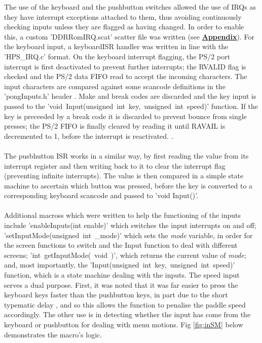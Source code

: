 \documentclass[a4paper,12pt]{article}
\begin{document}
\begin{flushleft}
The use of the keyboard and the pushbutton switches allowed the use of IRQs as they have interrupt exceptions attached to them, thus avoiding continuously checking inputs unless they are flagged as having changed. In order to enable this, a custom 'DDRRomIRQ.scat' scatter file was written (see \textbf{\hyperref[section:appendix]{Appendix}}). For the keyboard input, a keyboardISR handler was written in line with the 'HPS\_IRQ.c' format. On the keyboard interrupt flagging, the PS/2 port interrupt is first deactivated to prevent further interrupts; the RVALID flag is checked and the PS/2 data FIFO read \cite{altera_2014} to accept the incoming characters. The input characters are compared against some scancode definitions in the 'pongInputs.h' header \cite{altium_ps2}. Make and break codes are discarded and the key input is passed to the \mbox{'void Input(unsigned int key, unsigned int speed)'} function. If the key is preceeded by a break code it is discarded to prevent bounce from single presses; the PS/2 FIFO is finally cleared by reading it until RAVAIL is decremented to 1, before the interrupt is reactivated. \cite{altera_2014}.
\\ \- \\
The pusbhutton ISR works in a similar way, by first reading the value from its interrupt register and then writing back to it to clear the interrupt flag (preventing infinite interrupts). The value is then compared in a simple state machine to ascertain which button was pressed, before the key is converted to a corresponding keyboard scancode and passed to 'void Input()'. 
\\ \- \\
Additional macross which were written to help the functioning of the inputs include 'enableInputs(int enable)' which switches the input interrupts on and off; \mbox{'setInputMode(unsigned int \_mode)'} which sets the \textit{mode} variable, in order for the screen functions to switch and the Input function to deal with different screens; \mbox{'int getInputMode( void )'}, which returns the current value of \textit{mode}; and, most importantly, the \mbox{'Input(unsigned int key, unsigned int speed)'} function, which is a state machine dealing with the inputs. The speed input serves a dual purpose. First, it was noted that it was far easier to press the keyboard keys faster than the pushbutton keys, in part due to the short typematic delay \cite{altium_ps2}, and so this allows the function to penalise the paddle speed accordingly. The other use is in detecting whether the input has come from the keyboard or pushbutton for dealing with menu motions. Fig \ref{fig:inSM} below demonstrates the macro's logic.


\end{flushleft}
\end{document}
